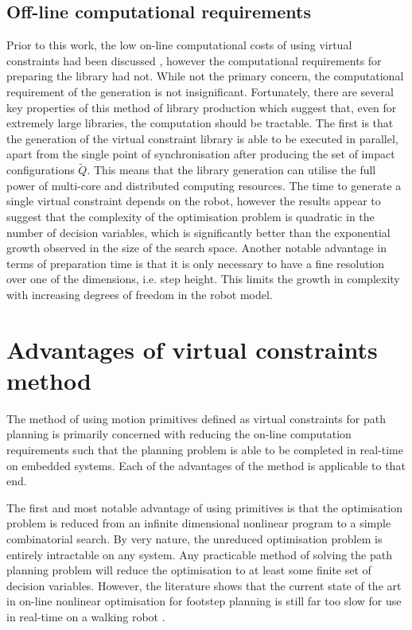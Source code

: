 \subsection{Off-line computational requirements}
Prior to this work, the low on-line computational costs of using virtual constraints had been discussed \cite{manchester13planning}, however the computational requirements for preparing the library had not. While not the primary concern, the computational requirement of the generation is not insignificant. Fortunately, there are several key properties of this method of library production which suggest that, even for extremely large libraries, the computation should be tractable. The first is that the generation of the virtual constraint library is able to be executed in parallel, apart from the single point of synchronisation after producing the set of impact configurations $\tilde{Q}$. This means that the library generation can utilise the full power of multi-core and distributed computing resources. The time to generate a single virtual constraint depends on the robot, however the results appear to suggest that the complexity of the optimisation problem is quadratic in the number of decision variables, which is significantly better than the exponential growth observed in the size of the search space. Another notable advantage in terms of preparation time is that it is only necessary to have a fine resolution over one of the dimensions, i.e. step height. This limits the growth in complexity with increasing degrees of freedom in the robot model.

\section{Advantages of virtual constraints method}
The method of using motion primitives defined as virtual constraints for path planning is primarily concerned with reducing the on-line computation requirements such that the planning problem is able to be completed in real-time on embedded systems. Each of the advantages of the method is applicable to that end.

The first and most notable advantage of using primitives is that the optimisation problem is reduced from an infinite dimensional nonlinear program to a simple combinatorial search. By very nature, the unreduced optimisation problem is entirely intractable on any system. Any practicable method of solving the path planning problem will reduce the optimisation to at least some finite set of decision variables. However, the literature shows that the current state of the art in on-line nonlinear optimisation for footstep planning is still far too slow for use in real-time on a walking robot \cite{shkolnik2011bounding}.

